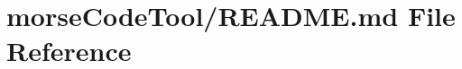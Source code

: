 \hypertarget{docs_2morseCodeTool_2README_8md}{}\section{morse\+Code\+Tool/\+R\+E\+A\+D\+ME.md File Reference}
\label{docs_2morseCodeTool_2README_8md}
